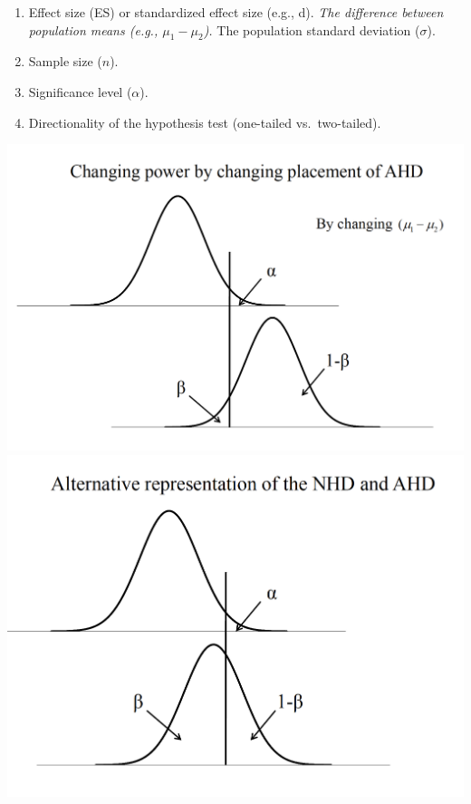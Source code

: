 \documentclass[]{book}
\providecommand{\tightlist}{%
  \setlength{\itemsep}{0pt}\setlength{\parskip}{0pt}}
\theoremstyle{definition}
\theoremstyle{definition}
\theoremstyle{definition}
\theoremstyle{remark}
\begin{document}
\begin{enumerate}
\def\labelenumi{\arabic{enumi}.}
\tightlist
\item
  Effect size (ES) or standardized effect size (e.g., d). \emph{The
  difference between population means (e.g., \(\mu_1-\mu_2\)). }The
  population standard deviation (\(\sigma\)).
\item
  Sample size (\(n\)).
\item
  Significance level (\(\alpha\)).
\item
  Directionality of the hypothesis test (one-tailed vs.~two-tailed).
\end{enumerate}

\includegraphics{img/hickspower5.png}
\includegraphics{img/hickspower6.png}
\end{document}
